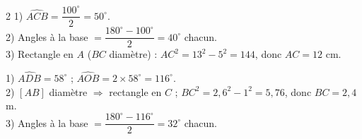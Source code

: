 \begin{multicols}{2}
1) $\widehat{ACB}=\dfrac{100^{\circ}}2=50^{\circ}$.\\
2) Angles à la base $=\dfrac{180^{\circ}-100^{\circ}}2=40^{\circ}$ chacun.\\
3) Rectangle en $A$ ($BC$ diamètre) : $AC^{2}=13^{2}-5^{2}=144$, donc $AC=12$ cm.

1) $\widehat{ADB}=58^{\circ}$ ; $\widehat{AOB}=2\times58^{\circ}=116^{\circ}$.\\
2) $[AB]$ diamètre $\Rightarrow$ rectangle en $C$ ;
$BC^{2}=2{,}6^{2}-1^{2}=5{,}76$, donc $BC=2{,}4$ m.\\
3) Angles à la base $=\dfrac{180^{\circ}-116^{\circ}}2=32^{\circ}$ chacun.

\end{multicols}
\exercicesBanner
